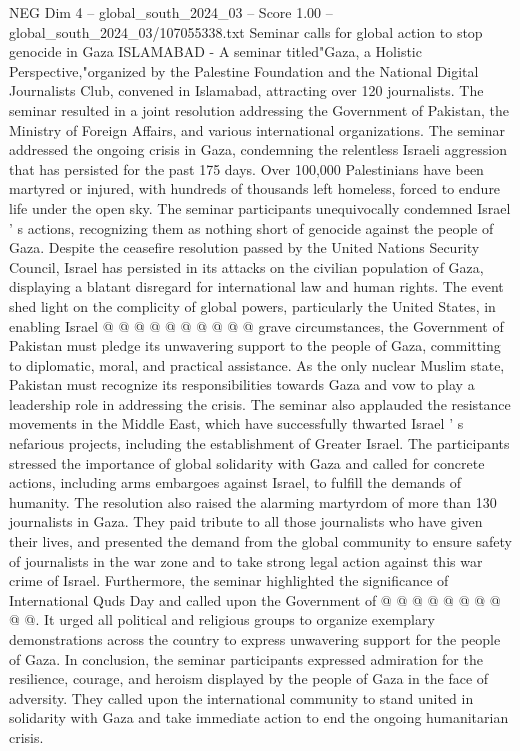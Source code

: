 \begin{textsample}{NEG Dim 4 – global\_south\_2024\_03 – Score 1.00 – global\_south\_2024\_03/107055338.txt}  \label{ex:f4_neg_352}
Seminar calls for global action to stop genocide in Gaza ISLAMABAD - A seminar titled"Gaza, a Holistic Perspective,"organized by the Palestine Foundation and the National Digital Journalists Club, convened in Islamabad, attracting over 120 journalists.
The seminar resulted in a joint resolution addressing the Government of Pakistan, the Ministry of Foreign Affairs, and various international organizations.
The seminar addressed the ongoing crisis in Gaza, condemning the relentless Israeli aggression that has persisted for the past 175 days.
Over 100,000 Palestinians have been martyred or injured, with hundreds of thousands left homeless, forced to endure life under the open sky.
The seminar participants unequivocally condemned Israel ' s actions, recognizing them as nothing short of genocide against the people of Gaza.
Despite the ceasefire resolution passed by the United Nations Security Council, Israel has persisted in its attacks on the civilian population of Gaza, displaying a blatant disregard for international law and human rights.
The event shed light on the complicity of global powers, particularly the United States, in enabling Israel @ @ @ @ @ @ @ @ @ @ grave circumstances, the Government of Pakistan must pledge its unwavering support to the people of Gaza, committing to diplomatic, moral, and practical assistance.
As the only nuclear Muslim state, Pakistan must recognize its responsibilities towards Gaza and vow to play a leadership role in addressing the crisis.
The seminar also applauded the resistance movements in the Middle East, which have successfully thwarted Israel ' s nefarious projects, including the establishment of Greater Israel.
The participants stressed the importance of global solidarity with Gaza and called for concrete actions, including arms embargoes against Israel, to fulfill the demands of humanity.
The resolution also raised the alarming martyrdom of more than 130 journalists in Gaza.
They paid tribute to all those journalists who have given their lives, and presented the demand from the global community to ensure safety of journalists in the war zone and to take strong legal action against this war crime of Israel.
Furthermore, the seminar highlighted the significance of International Quds Day and called upon the Government of @ @ @ @ @ @ @ @ @ @.
It urged all political and religious groups to organize exemplary demonstrations across the country to express unwavering support for the people of Gaza.
In conclusion, the seminar participants expressed admiration for the resilience, courage, and heroism displayed by the people of Gaza in the face of adversity.
They called upon the international community to stand united in solidarity with Gaza and take immediate action to end the ongoing humanitarian crisis.

\end{textsample}

